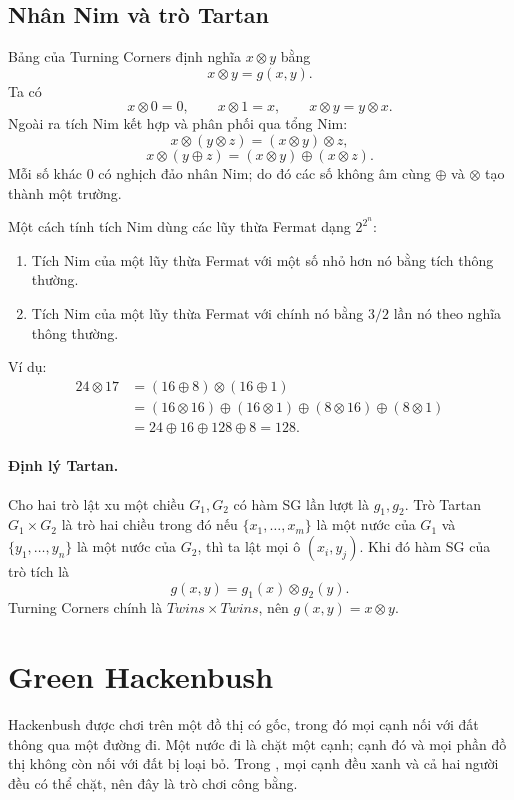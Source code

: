 \documentclass[11pt]{article}
\newcommand{\xor}{\mathbin{\oplus}}
\newcommand{\nimprod}{\mathbin{\otimes}}
\begin{document}
\subsection{Nhân Nim và trò Tartan}

Bảng của Turning Corners định nghĩa  \(x\nimprod y\) bằng
\[
  x\nimprod y=g(x,y).
\]
Ta có
\[
  x\nimprod0=0,\qquad x\nimprod1=x,\qquad
  x\nimprod y=y\nimprod x.
\]
Ngoài ra tích Nim kết hợp và phân phối qua tổng Nim:
\[
  x\nimprod(y\nimprod z)=(x\nimprod y)\nimprod z,
\]
\[
  x\nimprod(y\xor z)=(x\nimprod y)\xor(x\nimprod z).
\]
Mỗi số khác \(0\) có nghịch đảo nhân Nim; do đó các số không âm cùng \(\xor\)
và \(\nimprod\) tạo thành một trường.

Một cách tính tích Nim dùng các lũy thừa Fermat dạng \(2^{2^n}\):
\begin{enumerate}
  \item Tích Nim của một lũy thừa Fermat với một số nhỏ hơn nó bằng tích thông
  thường.
  \item Tích Nim của một lũy thừa Fermat với chính nó bằng \(3/2\) lần nó theo
  nghĩa thông thường.
\end{enumerate}
Ví dụ:
\[
\begin{aligned}
24\nimprod17
&=(16\xor8)\nimprod(16\xor1)\\
&=(16\nimprod16)\xor(16\nimprod1)\xor(8\nimprod16)\xor(8\nimprod1)\\
&=24\xor16\xor128\xor8=128.
\end{aligned}
\]

\paragraph{Định lý Tartan.}
Cho hai trò lật xu một chiều \(G_1,G_2\) có hàm SG lần lượt là \(g_1,g_2\).
Trò Tartan \(G_1\times G_2\) là trò hai chiều trong đó nếu
\(\{x_1,\ldots,x_m\}\) là một nước của \(G_1\) và
\(\{y_1,\ldots,y_n\}\) là một nước của \(G_2\), thì ta lật mọi ô
\((x_i,y_j)\). Khi đó hàm SG của trò tích là
\[
  g(x,y)=g_1(x)\nimprod g_2(y).
\]
Turning Corners chính là \(Twins\times Twins\), nên \(g(x,y)=x\nimprod y\).

\section{Green Hackenbush}

Hackenbush được chơi trên một đồ thị có gốc, trong đó mọi cạnh nối với đất
thông qua một đường đi. Một nước đi là chặt một cạnh; cạnh đó và mọi phần đồ
thị không còn nối với đất bị loại bỏ. Trong , mọi cạnh
đều xanh và cả hai người đều có thể chặt, nên đây là trò chơi công bằng.
\end{document}
